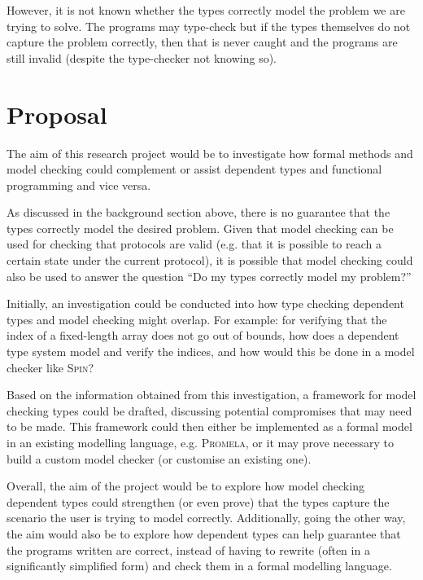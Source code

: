 \documentclass[11pt]{article}
\begin{document}
    However, it is not known whether the types correctly model the problem we
    are trying to solve. The programs may type-check but if the types themselves
    do not capture the problem correctly, then that is never caught and the
    programs are still invalid (despite the type-checker not knowing so).
    
    \section*{Proposal}
    The aim of this research project would be to investigate how formal methods
    and model checking could complement or assist dependent types and
    functional programming and vice versa.
    
    As discussed in the background section above, there is no guarantee that the
    types correctly model the desired problem. Given that model checking can be
    used for checking that protocols are valid (e.g. that it is possible to
    reach a certain state under the current protocol), it is possible that model
    checking could also be used to answer the question ``Do my types correctly
    model my problem?''
    
    Initially, an investigation could be conducted into how type checking
    dependent types and model checking might overlap. For example: for
    verifying that the index of a fixed-length array does not go out of bounds,
    how does a dependent type system model and verify the indices, and how
    would this be done in a model checker like \textsc{Spin}?
    
    Based on the information obtained from this investigation, a framework for
    model checking types could be drafted, discussing potential compromises
    that may need to be made. This framework could then either be implemented
    as a formal model in an existing modelling language, e.g. \textsc{Promela},
    or it may prove necessary to build a custom model checker (or customise an
    existing one).
    
    Overall, the aim of the project would be to explore how model checking
    dependent types could strengthen (or even prove) that the types capture the
    scenario the user is trying to model correctly. Additionally, going the
    other way, the aim would also be to explore how dependent types can help
    guarantee that the programs written are correct, instead of having to
    rewrite (often in a significantly simplified form) and check them in a
    formal modelling language.
    
    \newpage
    
    \printbibliography
    
\end{document}
